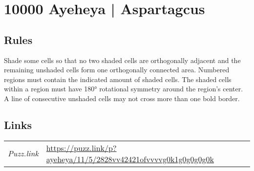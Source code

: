 \section[10000 Ayeheya | Aspartagcus {[\emph{Ayeheya}]}]{10000 Ayeheya | {\normalfont Aspartagcus}}
\label{sec:55-10000-ayeheya-aspartagcus}

\subsection*{Rules}
\begin{markdown}
Shade some cells so that no two shaded cells are orthogonally adjacent and the remaining unshaded cells form one orthogonally connected area. Numbered regions must contain the indicated amount of shaded cells. The shaded cells within a region must have 180° rotational symmetry around the region’s center. A line of consecutive unshaded cells may not cross more than one bold border.
\end{markdown}
\subsection*{Links}
\begin{tabularx}{\textwidth}{l X}
\emph{Puzz.link} & \url{https://puzz.link/p?ayeheya/11/5/2828vv42421ofvvvvg0k1g0g0g0g0k} \\
\end{tabularx}
\pagebreak
